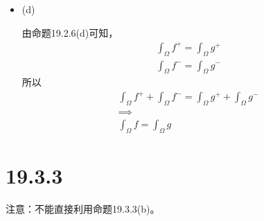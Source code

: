 \documentclass{article}
\begin{document}
\begin{itemize}
  \item (d)

        由命题19.2.6(d)可知，
        \begin{align*}
          \int_{\Omega} f^+ = \int_{\Omega} g^+ \\
          \int_{\Omega} f^- = \int_{\Omega} g^-
        \end{align*}
        所以
        \begin{align*}
          \int_{\Omega} f^+  + \int_{\Omega} f^- = \int_{\Omega} g^+ + \int_{\Omega} g^- \\
          \implies                                                                       \\
          \int_{\Omega} f = \int_{\Omega} g
        \end{align*}

\end{itemize}

\section*{19.3.3}

注意：不能直接利用命题19.3.3(b)。
\end{document}
